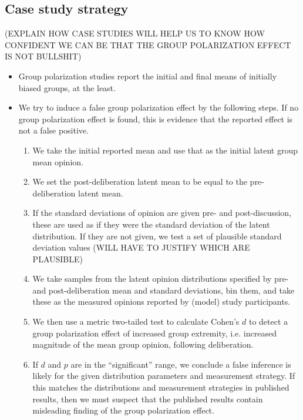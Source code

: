 \documentclass[11pt,letterpaper]{article}
\begin{document}
\subsection{Case study strategy}
(EXPLAIN HOW CASE STUDIES WILL HELP US TO KNOW HOW CONFIDENT WE CAN BE THAT
THE GROUP POLARIZATION EFFECT IS NOT BULLSHIT)
\begin{itemize}
  \item 
    Group polarization studies report the initial and final means of initially
    biased groups, at the least. 
  \item
    We try to induce a false group polarization effect by the following steps.
    If no group polarization effect is found, this is evidence that the
    reported effect is not a false positive. 
    \begin{enumerate}
      \item 
        We take the initial reported mean and use that as the initial latent
        group mean opinion. 
      \item
        We set the post-deliberation latent mean to be equal to the 
        pre-deliberation latent mean.
      \item
        If the standard deviations of opinion are given pre- and post-discussion, 
        these are used as if they were the standard deviation of the latent 
        distribution. If they are not given, we test a set of plausible 
        standard deviation values (WILL HAVE TO JUSTIFY WHICH ARE PLAUSIBLE)
      \item
        We take samples from the latent opinion distributions specified
        by pre- and post-deliberation mean and standard deviations, bin them,
        and take these as the measured opinions reported by (model)
        study participants. 
      \item
        We then use a metric two-tailed test to calculate Cohen's $d$ to detect
        a group polarization effect of increased group extremity, i.e. increased
        magnitude of the mean group opinion, following deliberation.
      \item
        If $d$ and $p$ are in the ``significant''  range, 
        we conclude a false inference is likely for the
        given distribution parameters and measurement strategy. If this 
        matches the distributions and measurement strategies in published
        results, then we must suspect that the published results contain
        misleading finding of the group polarization effect.
    \end{enumerate}
\end{itemize}
\end{document}
